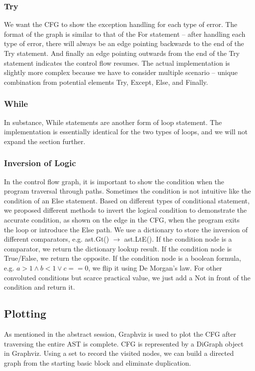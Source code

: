 \documentclass[11pt]{article}
\begin{document}
\subsubsection{Try}
We want the CFG to show the exception handling for each type of error. The format of the graph is similar to that of the For statement -- after handling each type of error, there will always be an edge pointing backwards to the end of the Try statement. And finally an edge pointing outwards from the end of the Try statement indicates the control flow resumes. The actual implementation is slightly more complex because we have to consider multiple scenario -- unique combination from potential elements Try, Except, Else, and Finally.

\subsubsection{While}
In substance, While statements are another form of loop statement. The implementation is essentially identical for the two types of loops, and we will not expand the section further.


\subsubsection{Inversion of Logic}
In the control flow graph, it is important to show the condition when the program traversal through paths. Sometimes the condition is not intuitive like the condition of an Else statement. Based on different types of conditional statement, we proposed different methods to invert the logical condition to demonstrate the accurate condition, as shown on the edge in the CFG, when the program exits the loop or introduce the Else path. We use a dictionary to store the inversion of different comparators, e.g. ast.Gt() $\rightarrow$ ast.LtE(). If the condition node is a comparator, we return the dictionary lookup result. If the condition node is True/False, we return the opposite. If the condition node is a boolean formula, e.g. $a>1 \land b<1 \lor c==0$, we flip it using De Morgan's law. For other convoluted conditions but scarce practical value, we just add a Not in front of the condition and return it.

\subsection{Plotting}
As mentioned in the abstract session, Graphviz is used to plot the CFG after traversing the entire AST is complete. CFG is represented by a DiGraph object in Graphviz. Using a set to record the visited nodes, we can build a directed graph from the starting basic block and eliminate duplication.
\end{document}
